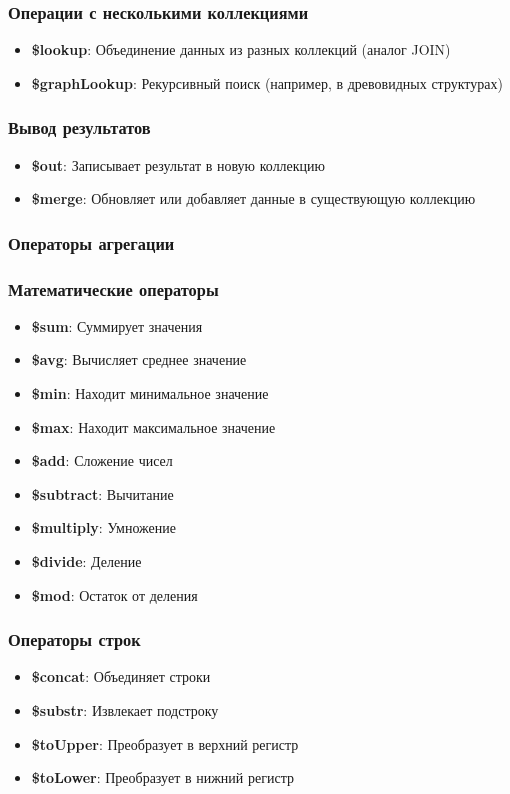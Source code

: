 \documentclass[a4paper,12pt]{article}
\begin{document}
\subsubsection{Операции с несколькими коллекциями}
\begin{itemize}[noitemsep]
    \item \textbf{\$lookup}: Объединение данных из разных коллекций (аналог JOIN)
    \item \textbf{\$graphLookup}: Рекурсивный поиск (например, в древовидных структурах)
\end{itemize}

\subsubsection{Вывод результатов}
\begin{itemize}[noitemsep]
    \item \textbf{\$out}: Записывает результат в новую коллекцию
    \item \textbf{\$merge}: Обновляет или добавляет данные в существующую коллекцию
\end{itemize}

\subsubsection{Операторы агрегации}

\subsubsection{Математические операторы}
\begin{itemize}[noitemsep]
    \item \textbf{\$sum}: Суммирует значения
    \item \textbf{\$avg}: Вычисляет среднее значение
    \item \textbf{\$min}: Находит минимальное значение
    \item \textbf{\$max}: Находит максимальное значение
    \item \textbf{\$add}: Сложение чисел
    \item \textbf{\$subtract}: Вычитание
    \item \textbf{\$multiply}: Умножение
    \item \textbf{\$divide}: Деление
    \item \textbf{\$mod}: Остаток от деления
\end{itemize}

\subsubsection{Операторы строк}
\begin{itemize}[noitemsep]
    \item \textbf{\$concat}: Объединяет строки
    \item \textbf{\$substr}: Извлекает подстроку
    \item \textbf{\$toUpper}: Преобразует в верхний регистр
    \item \textbf{\$toLower}: Преобразует в нижний регистр
\end{itemize}
\end{document}
